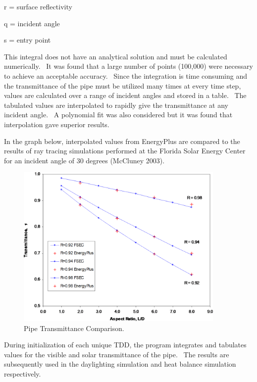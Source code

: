 r = surface reflectivity

q = incident angle

s = entry point

This integral does not have an analytical solution and must be calculated numerically.~ It was found that a large number of points (100,000) were necessary to achieve an acceptable accuracy.~ Since the integration is time consuming and the transmittance of the pipe must be utilized many times at every time step, values are calculated over a range of incident angles and stored in a table.~ The tabulated values are interpolated to rapidly give the transmittance at any incident angle.~ A polynomial fit was also considered but it was found that interpolation gave superior results.

In the graph below, interpolated values from EnergyPlus are compared to the results of ray tracing simulations performed at the Florida Solar Energy Center for an incident angle of 30 degrees (McCluney 2003).

\begin{figure}[hbtp] %
\centering
\includegraphics[width=0.9\textwidth, height=0.9\textheight, keepaspectratio=true]{media/image874.png}
\caption{Pipe Transmittance Comparison. \protect \label{fig:pipe-transmittance-comparison.}}
\end{figure}

During initialization of each unique TDD, the program integrates and tabulates values for the visible and solar transmittance of the pipe.~ The results are subsequently used in the daylighting simulation and heat balance simulation respectively.

